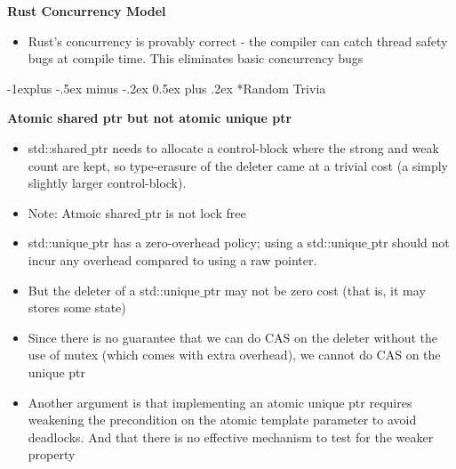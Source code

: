 \documentclass[10pt, landscape]{article}
\makeatletter
\renewcommand{\subsection}{\@startsection{subsection}{2}{0mm}%
                                {-1explus -.5ex minus -.2ex}%
                                {0.5ex plus .2ex}%
                                {\normalfont\normalsize\bfseries}}
\makeatother
\begin{document}
\begin{multicols}{4}
\textbf{Rust Concurrency Model} \\
\begin{itemize}
    \item Rust's concurrency is provably correct - the compiler can catch thread safety bugs at compile time. This eliminates basic concurrency bugs
\end{itemize}

\subsection*{Random Trivia}

\textbf{Atomic shared ptr but not atomic unique ptr} \\
\begin{itemize}
    \item std::shared$\_$ptr needs to allocate a control-block where the strong and weak count are kept, so type-erasure of the deleter came at a trivial cost (a simply slightly larger control-block).
    \item Note: Atmoic shared$\_$ptr is not lock free
    \item std::unique$\_$ptr has a zero-overhead policy; using a std::unique$\_$ptr should not incur any overhead compared to using a raw pointer.
    \item But the deleter of a std::unique$\_$ptr may not be zero cost (that is, it may stores some state)
    \item Since there is no guarantee that we can do CAS on the deleter without the use of mutex (which comes with extra overhead), we cannot do CAS on the unique ptr
    \item Another argument is that implementing an atomic unique ptr requires weakening the precondition on the atomic template parameter to avoid deadlocks. And that there is no effective mechanism to test for the weaker property
\end{itemize}

\end{multicols}
\end{document}
